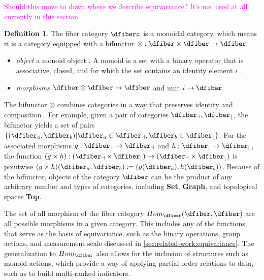 \documentclass[10pt,journal,compsoc]{IEEEtran}
\newcommand{\note}[1]{\textcolor{magenta}{#1}}
\theoremstyle{definition}
\newtheorem{definition}{Definition}[section]
\theoremstyle{remark}
\begin{document}
\note{Should this move to down where we describe equivariance? It's not used at all currently in this section}
\begin{definition} 
  \label{def:category:F} The fiber category $\mathcal{\dfiberc}$ is a monoidal category\cite{milewskiCategoryTheoryProgrammers}, which means it is a category equipped with a bifunctur $\otimes: \mathcal{\dfiber} \times \mathcal{\dfiber} \rightarrow \mathcal{\dfiber}$
  \begin{itemize}
    \item \textit{object} a monoid object \dfiber. A monoid is a set with a binary operator that is associative, closed, and for which the set contains an identity element $i$ \cite{nlan:monoid}.
    \item \textit{morphisms} $\dfiber \otimes \dfiber \rightarrow \dfiber$ and unit $i \rightarrow \dfiber$
  \end{itemize}
\end{definition}
The bifunctor $\otimes$ combines categories in a way that  preserves identity and composition \cite{fongInvitationAppliedCategory2019}. For example, given a pair of categories $\mathcal{\dfiber_a},\mathcal{\dfiber_b}$, the bifunctor yields a set of pairs $\{(\dfiber_a, \dfiber_b) | \dfiber_a \in \mathcal{\dfiber_a}, \dfiber_b \in \mathcal{\dfiber_b}\}$. For the associated morphisms $g: \mathcal{\dfiber_a}\rightarrow \mathcal{\dfiber_a}$ and $h: \mathcal{\dfiber_b}\rightarrow \mathcal{\dfiber_b}$, the function $(g\times h): (\mathcal{\dfiber_a}\times \mathcal{\dfiber_b}) \rightarrow (\mathcal{\dfiber_a}\times \mathcal{\dfiber_b})$ is pointwise $(g\times h)(\dfiber_a, \dfiber_b)\coloneqq (g(\dfiber_a), h(\dfiber_b))$. Because of the bifunctor, objects of the category $\mathcal{\dfiber}$ can be the product of any arbitrary number and types of categories, including \textbf{Set}, \textbf{Graph}, and topological spaces \textbf{Top}.

The set of all morphism of the fiber category $Hom_{\mathcal{\dfiber}}(\dfiber, \dfiber)$ are all possible morphisms in a given category. This includes any of the functions that serve as the basis of equivariance, such as the binary operations, group actions, and measurement scale discussed in  \autoref{sec:related-work:equivariance}. The generalization to $Hom_\mathcal{\dfiber}$ also allows for the inclusion of structures such as monoid actions\cite{barrCategoryTheoryComputing}, which provide a way of applying partial order relations to data\cite{fongInvitationAppliedCategory2019}, such as to build multi-ranked indicators\cite{bruggemannRankingPrioritizationMultiindicator2011}.
\end{document}
